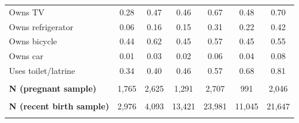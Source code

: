 \begin{tabular}{lcccccc}
Owns TV&0.28&0.47&0.46&0.67&0.48&0.70\\
Owns refrigerator&0.06&0.16&0.15&0.31&0.22&0.42\\
Owns bicycle&0.44&0.62&0.45&0.57&0.45&0.55\\
Owns car&0.01&0.03&0.02&0.06&0.04&0.08\\
Uses toilet/latrine&0.34&0.40&0.46&0.57&0.68&0.81\\
&&&&&&\\
\textbf{N (pregnant sample)}&1,765&2,625&1,291&2,707&991&2,046\\
&&&&&&\\
\textbf{N (recent birth sample)}&2,976&4,093&13,421&23,981&11,045&21,647\\
&&&&&&\\
\bottomrule
\end{tabular}
